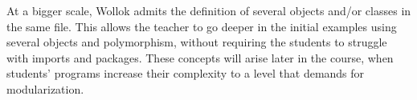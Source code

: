 At a bigger scale, Wollok admits the definition of several objects and/or classes in the same file. 
This allows the teacher to go deeper in the initial examples using several objects and polymorphism, without requiring the students to struggle with imports and packages.
These concepts will arise later in the course, when students' programs increase their complexity to a level that demands for modularization. 


%
%
%
%


